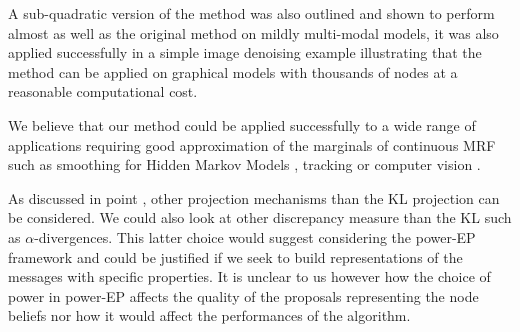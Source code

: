 A sub-quadratic version of the method was also outlined and shown to perform almost as well as the original method on mildly multi-modal models, it was also applied successfully in a simple image denoising example illustrating that the method can be applied on graphical models with thousands of nodes at a reasonable computational cost.

We believe that our method could be applied successfully to a wide range of applications requiring good approximation of the marginals of continuous MRF such as smoothing for Hidden Markov Models \cite{briers10}, tracking or computer vision \cite{sudderth04,felzenszwalb04}. 


As discussed in point \label{point:epbp-proj}, other projection mechanisms than the KL projection can be considered. We could also look at other discrepancy measure than the KL such as $\alpha$-divergences. This latter choice would suggest considering the power-EP framework \citep{minka04} and could be justified if we seek to build representations of the messages with specific properties. It is unclear to us however how the choice of power in power-EP affects the quality of the proposals representing the node beliefs nor how it would affect the performances of the algorithm.



